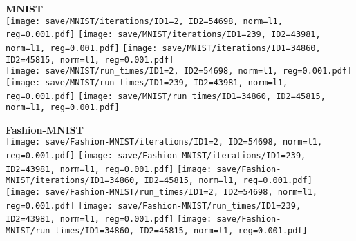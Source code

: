 {    \begin{minipage}[c]{0.48\textwidth}
        \centering
        \vspace{1em}
        {\bf\color{sufered} MNIST} \\ \vspace{0.3em}
        \texttt{[image: save/MNIST/iterations/ID1=2, ID2=54698, norm=l1, reg=0.001.pdf]}
        \texttt{[image: save/MNIST/iterations/ID1=239, ID2=43981, norm=l1, reg=0.001.pdf]}
        \texttt{[image: save/MNIST/iterations/ID1=34860, ID2=45815, norm=l1, reg=0.001.pdf]} \\
        \texttt{[image: save/MNIST/run\_times/ID1=2, ID2=54698, norm=l1, reg=0.001.pdf]}
        \texttt{[image: save/MNIST/run\_times/ID1=239, ID2=43981, norm=l1, reg=0.001.pdf]}
        \texttt{[image: save/MNIST/run\_times/ID1=34860, ID2=45815, norm=l1, reg=0.001.pdf]} \\
    \end{minipage}
    \hfill
    \begin{minipage}[c]{0.48\textwidth}
        \centering
        \vspace{1em}
        {\bf\color{sufered} Fashion-MNIST} \\ \vspace{0.3em}
        \texttt{[image: save/Fashion-MNIST/iterations/ID1=2, ID2=54698, norm=l1, reg=0.001.pdf]}
        \texttt{[image: save/Fashion-MNIST/iterations/ID1=239, ID2=43981, norm=l1, reg=0.001.pdf]}
        \texttt{[image: save/Fashion-MNIST/iterations/ID1=34860, ID2=45815, norm=l1, reg=0.001.pdf]} \\
        \texttt{[image: save/Fashion-MNIST/run\_times/ID1=2, ID2=54698, norm=l1, reg=0.001.pdf]}
        \texttt{[image: save/Fashion-MNIST/run\_times/ID1=239, ID2=43981, norm=l1, reg=0.001.pdf]}
        \texttt{[image: save/Fashion-MNIST/run\_times/ID1=34860, ID2=45815, norm=l1, reg=0.001.pdf]} \\
    \end{minipage}

}
